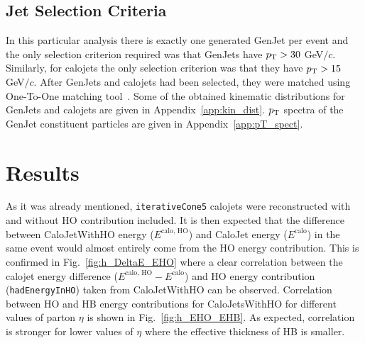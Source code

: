 \documentclass{cmspaper}
\begin{document}
\subsection{Jet Selection Criteria}

In this particular analysis there is exactly one generated GenJet per event and the only selection criterion required was that GenJets have $p_\text T>30$ GeV$/c$. Similarly, for calojets the only selection criterion was that they have $p_\text T>15$ GeV$/c$. After GenJets and calojets had been selected, they were matched using One-To-One matching tool~\cite{ref:one_to_one}. Some of the obtained kinematic distributions for GenJets and calojets are given in Appendix~\ref{app:kin_dist}. $p_\text T$ spectra of the GenJet constituent particles are given in Appendix~\ref{app:pT_spect}.


\section{Results}
\label{sc:results}

As it was already mentioned, \texttt{iterativeCone5} calojets were reconstructed with and without HO contribution included. It is then expected that the difference between CaloJetWithHO energy ($E^\text{calo, HO}$) and CaloJet energy ($E^\text{calo}$) in the same event would almost entirely come from the HO energy contribution. This is confirmed in Fig.~\ref{fig:h_DeltaE_EHO} where a clear correlation between the calojet energy difference ($E^\text{calo, HO}-E^\text{calo}$) and HO energy contribution (\texttt{hadEnergyInHO}) taken from CaloJetWithHO can be observed. Correlation between HO and HB energy contributions for CaloJetsWithHO for different values of parton $\eta$ is shown in Fig.~\ref{fig:h_EHO_EHB}. As expected, correlation is stronger for lower values of $\eta$ where the effective thickness of HB is smaller.
\end{document}
